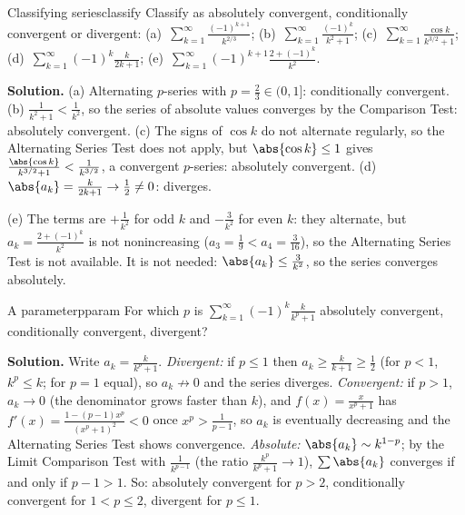 \documentclass[11pt]{article}
\begin{document}
\begin{exmp}{Classifying series}{classify}
Classify as absolutely convergent, conditionally convergent or divergent: (a)~$\displaystyle\sum_{k=1}^\infty\frac{(-1)^{k+1}}{k^{2/3}}$; \quad (b)~$\displaystyle\sum_{k=1}^\infty\frac{(-1)^k}{k^2+1}$; \quad (c)~$\displaystyle\sum_{k=1}^\infty\frac{\cos k}{k^{3/2}+1}$; \quad (d)~$\displaystyle\sum_{k=1}^\infty(-1)^k\frac k{2k+1}$; \quad (e)~$\displaystyle\sum_{k=1}^\infty(-1)^{k+1}\frac{2+(-1)^k}{k^2}$.

\textbf{Solution.} (a) Alternating $p$-series with $p=\frac23\in(0,1]$: conditionally convergent. (b) $\frac1{k^2+1}<\frac1{k^2}$, so the series of absolute values converges by the Comparison Test: absolutely convergent. (c) The signs of $\cos k$ do not alternate regularly, so the Alternating Series Test does not apply, but $\abs{\cos k}\le1$ gives $\frac{\abs{\cos k}}{k^{3/2}+1}<\frac1{k^{3/2}}$, a convergent $p$-series: absolutely convergent. (d) $\abs{a_k}=\frac k{2k+1}\to\frac12\ne0$: diverges.

(e) The terms are $+\frac1{k^2}$ for odd $k$ and $-\frac3{k^2}$ for even $k$: they alternate, but $a_k=\frac{2+(-1)^k}{k^2}$ is not nonincreasing ($a_3=\frac19<a_4=\frac3{16}$), so the Alternating Series Test is not available. It is not needed: $\abs{a_k}\le\frac3{k^2}$, so the series converges absolutely.
\end{exmp}

\begin{exmp}{A parameter}{pparam}
For which $p$ is $\displaystyle\sum_{k=1}^\infty(-1)^k\frac k{k^p+1}$ absolutely convergent, conditionally convergent, divergent?

\textbf{Solution.} Write $a_k=\frac k{k^p+1}$. \emph{Divergent:} if $p\le1$ then $a_k\ge\frac k{k+1}\ge\frac12$ (for $p<1$, $k^p\le k$; for $p=1$ equal), so $a_k\not\to0$ and the series diverges. \emph{Convergent:} if $p>1$, $a_k\to0$ (the denominator grows faster than $k$), and $f(x)=\frac x{x^p+1}$ has $f'(x)=\frac{1-(p-1)x^p}{(x^p+1)^2}<0$ once $x^p>\frac1{p-1}$, so $a_k$ is eventually decreasing and the Alternating Series Test shows convergence. \emph{Absolute:} $\abs{a_k}\sim k^{1-p}$; by the Limit Comparison Test with $\frac1{k^{p-1}}$ (the ratio $\frac{k^p}{k^p+1}\to1$), $\sum\abs{a_k}$ converges if and only if $p-1>1$. So: absolutely convergent for $p>2$, conditionally convergent for $1<p\le2$, divergent for $p\le1$.
\end{exmp}
\end{document}
